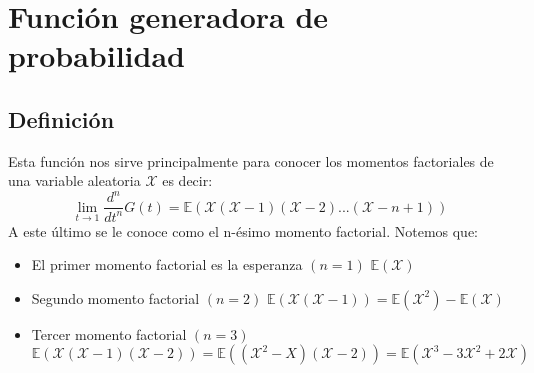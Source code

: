 \chapter{Función generadora de probabilidad}
\section{Definición}


Esta función nos sirve principalmente para conocer los momentos factoriales de una variable aleatoria $\mathcal X$ es decir:
  \[
  \lim_{t \to 1} \frac{d^n}{dt^n}G(t) = \mathbb E(\mathcal X(\mathcal X-1)(\mathcal X-2)...(\mathcal X-n+1))
\]
A este último se le conoce como el n-ésimo momento factorial. Notemos que:
\begin{itemize}
    \item El primer momento factorial es la esperanza $(n=1)$ $\mathbb E(\mathcal X)$
    \item Segundo momento factorial $(n=2)$ $\mathbb{E}(\mathcal X(\mathcal X-1))=\mathbb{E}(\mathcal X^2)-\mathbb{E}(\mathcal X)$
    \item Tercer momento factorial $(n=3)$ $\mathbb{E}(\mathcal X(\mathcal X-1)(\mathcal X-2))=\mathbb{E}((\mathcal X^2-X)(\mathcal X-2))=\mathbb{E}(\mathcal X^3-3\mathcal X^2+2\mathcal X)$
\end{itemize}

